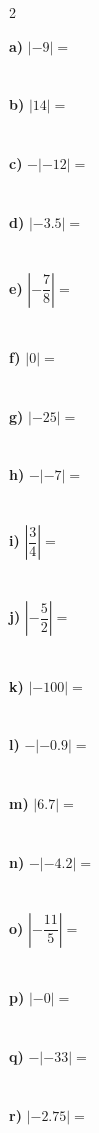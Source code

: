 \documentclass[12pt, letterpaper, fleqn]{article}
\newcommand{\blank}{\underline{\hspace{2.2cm}}}
\begin{document}
\begin{multicols}{2}

\noindent
\textbf{a)} $|-9| = $ \blank \\ \\ \\
\textbf{b)} $|14| = $ \blank \\ \\ \\
\textbf{c)} $-|-12| = $ \blank \\ \\ \\
\textbf{d)} $|-3.5| = $ \blank  \\ \\ \\
\textbf{e)} $\left|-\dfrac{7}{8}\right| = $ \blank \\ \\ \\
\textbf{f)} $|0| = $ \blank \\ \\ \\
\textbf{g)} $|{-25}| = $ \blank \\ \\ \\
\textbf{h)} $-|{-7}| = $ \blank \\ \\ \\
\textbf{i)} $\left|\dfrac{3}{4}\right| = $ \blank \\ \\ \\
\textbf{j)} $\left|-\dfrac{5}{2}\right| = $ \blank \\ \\ \\
\textbf{k)} $|{-100}| = $ \blank \\ \\ \\
\textbf{l)} $-|{-0.9}| = $ \blank \\ \\ \\
\textbf{m)} $|6.7| = $ \blank \\ \\ \\
\textbf{n)} $-|{-4.2}| = $ \blank \\ \\ \\
\textbf{o)} $\left|-\dfrac{11}{5}\right| = $ \blank \\ \\ \\
\textbf{p)} $|{-0}| = $ \blank \\ \\ \\
\textbf{q)} $-|{-33}| = $ \blank \\ \\ \\
\textbf{r)} $|{-2.75}| = $ \blank \\ \\ \\

\end{multicols}
\end{document}
